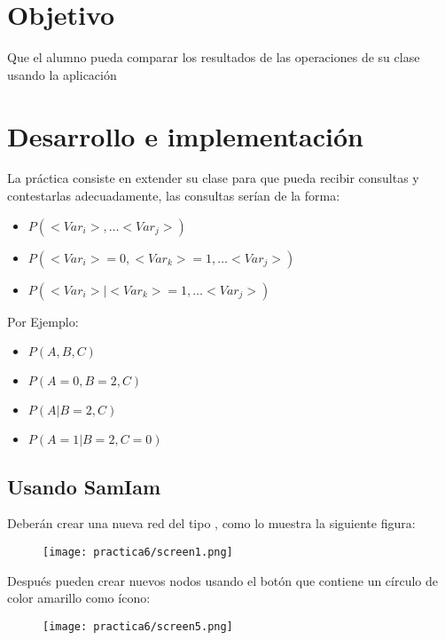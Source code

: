 
\section{Objetivo}
Que el alumno pueda comparar los resultados de las operaciones de su clase  usando la aplicación  \par

\section{Desarrollo e implementaci\'on}

\noindent La práctica consiste en extender su clase  para que pueda recibir consultas y contestarlas adecuadamente, las consultas serían de la forma:

\begin{itemize}
  \item \(P(<Var_i>, \dots <Var_j>)\)
  \item \(P(<Var_i>=0, <Var_k>=1, \dots <Var_j>)\)
  \item \(P(<Var_i> | <Var_k>=1, \dots <Var_j>)\)
\end{itemize}

\noindent Por Ejemplo:

\begin{itemize}
  \item \(P(A,B,C)\)
  \item \(P(A=0,B=2,C)\)
  \item \(P(A|B=2,C)\)
  \item \(P(A=1|B=2,C=0)\)
\end{itemize}


\subsection{Usando SamIam}

\noindent Deberán crear una nueva red del tipo , como lo muestra la siguiente figura:

\begin{figure}[H]
  \centering
  \texttt{[image: practica6/screen1.png]}
  \caption{}
\end{figure}

\noindent Después pueden crear nuevos nodos usando el botón que contiene un círculo de color amarillo como ícono:

\begin{figure}[H]
  \centering
  \texttt{[image: practica6/screen5.png]}
  \caption{}
\end{figure}

